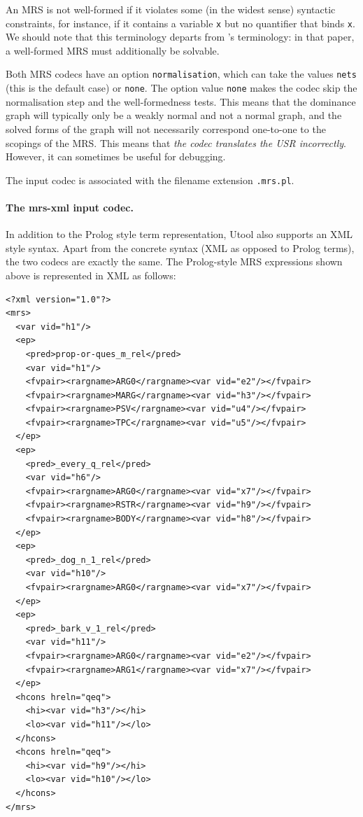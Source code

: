 An MRS is not well-formed if it violates some (in the widest sense)
syntactic constraints, for instance, if it contains a variable
\verb|x| but no quantifier that binds \verb|x|. We should note that
this terminology departs from \cite{CopFliSag97}'s terminology: in
that paper, a well-formed MRS must additionally be solvable.

Both MRS codecs have an option \verb?normalisation?, which can take the values \verb?nets? (this is the default case) or \verb?none?. The option value \verb?none? makes the codec skip the normalisation step and the well-formedness tests. This means that the dominance graph will typically only be a weakly normal and not a normal graph, and the solved forms of the graph will not necessarily correspond one-to-one to the scopings of the MRS. This means that \emph{the codec translates the USR incorrectly}. However, it can sometimes be useful for debugging.

The input codec is associated with the filename extension \verb|.mrs.pl|.

\paragraph{The mrs-xml input codec.}

In addition to the Prolog style term representation, Utool also
supports an XML style syntax. Apart from the concrete syntax (XML as
opposed to Prolog terms), the two codecs are exactly the same. The
Prolog-style MRS expressions shown above is represented in XML as
follows:

\begin{verbatim}
<?xml version="1.0"?>
<mrs>
  <var vid="h1"/>
  <ep>
    <pred>prop-or-ques_m_rel</pred>
    <var vid="h1"/>
    <fvpair><rargname>ARG0</rargname><var vid="e2"/></fvpair>
    <fvpair><rargname>MARG</rargname><var vid="h3"/></fvpair>
    <fvpair><rargname>PSV</rargname><var vid="u4"/></fvpair>
    <fvpair><rargname>TPC</rargname><var vid="u5"/></fvpair>
  </ep>
  <ep>
    <pred>_every_q_rel</pred>
    <var vid="h6"/>
    <fvpair><rargname>ARG0</rargname><var vid="x7"/></fvpair>
    <fvpair><rargname>RSTR</rargname><var vid="h9"/></fvpair>
    <fvpair><rargname>BODY</rargname><var vid="h8"/></fvpair>
  </ep>
  <ep>
    <pred>_dog_n_1_rel</pred>
    <var vid="h10"/>
    <fvpair><rargname>ARG0</rargname><var vid="x7"/></fvpair>
  </ep>
  <ep>
    <pred>_bark_v_1_rel</pred>
    <var vid="h11"/>
    <fvpair><rargname>ARG0</rargname><var vid="e2"/></fvpair>
    <fvpair><rargname>ARG1</rargname><var vid="x7"/></fvpair>
  </ep>
  <hcons hreln="qeq">
    <hi><var vid="h3"/></hi>
    <lo><var vid="h11"/></lo>
  </hcons>
  <hcons hreln="qeq">
    <hi><var vid="h9"/></hi>
    <lo><var vid="h10"/></lo>
  </hcons>
</mrs>
\end{verbatim}

